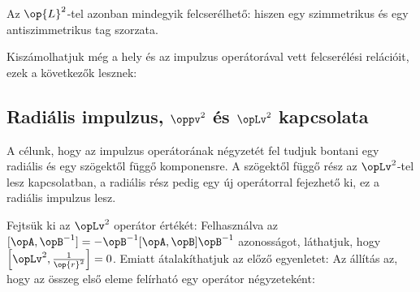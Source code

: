    Az $\op{L}^2$-tel azonban mindegyik felcserélhető:
   hiszen egy szimmetrikus és egy antiszimmetrikus tag szorzata.
   
   Kiszámolhatjuk még a hely és az impulzus operátorával vett felcserélési relációit, ezek a következők lesznek:
   
  \subsection{Radiális impulzus, $\oppv^2$ és $\opLv^2$ kapcsolata}
   
   A célunk, hogy az impulzus operátorának négyzetét fel tudjuk bontani egy radiális és egy szögektől függő komponensre.
   A szögektől függő rész az $\opLv^2$-tel lesz kapcsolatban, a radiális rész pedig egy új operátorral fejezhető ki, ez a radiális impulzus lesz. 
   
   Fejtsük ki az $\opLv^2$ operátor értékét:
   Felhasználva az $[\opA,\opB^{-1}]=-\opB^{-1}[\opA,\opB]\opB^{-1}$ azonosságot, láthatjuk, hogy $\left[\opLv^2,\frac{1}{\op{r}^2}\right]=0$.
   Emiatt átalakíthatjuk az előző egyenletet:
   Az állítás az, hogy az összeg első eleme felírható egy operátor négyzeteként:
   
